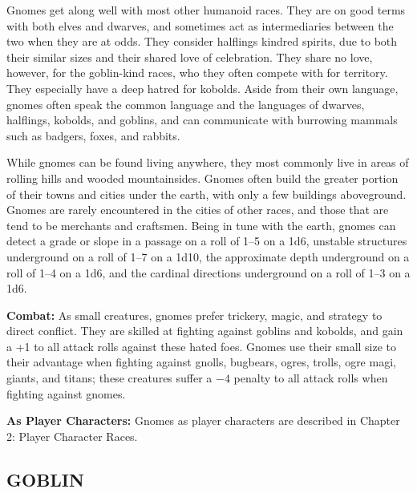 \begin{multicols}{2}
Gnomes get along well with most other humanoid races. They are on good terms with both elves and dwarves, and sometimes act as intermediaries between the two when they are at odds. They consider halflings kindred spirits, due to both their similar sizes and their shared love of celebration. They share no love, however, for the goblin-kind races, who they often compete with for territory. They especially have a deep hatred for kobolds. Aside from their own language, gnomes often speak the common language and the languages of dwarves, halflings, kobolds, and goblins, and can communicate with burrowing mammals such as badgers, foxes, and rabbits.

While gnomes can be found living anywhere, they most commonly live in areas of rolling hills and wooded mountainsides. Gnomes often build the greater portion of their towns and cities under the earth, with only a few buildings aboveground. Gnomes are rarely encountered in the cities of other races, and those that are tend to be merchants and craftsmen. Being in tune with the earth, gnomes can detect a grade or slope in a passage on a roll of 1--5 on a 1d6, unstable structures underground on a roll of 1--7 on a 1d10, the approximate depth underground on a roll of 1--4 on a 1d6, and the cardinal directions underground on a roll of 1--3 on a 1d6.

\textbf{Combat:} As small creatures, gnomes prefer trickery, magic, and strategy to direct conflict. They are skilled at fighting against goblins and kobolds, and gain a +1 to all attack rolls against these hated foes. Gnomes use their small size to their advantage when fighting against gnolls, bugbears, ogres, trolls, ogre magi, giants, and titans; these creatures suffer a $-4$ penalty to all attack rolls when fighting against gnomes.

\textbf{As Player Characters:} Gnomes as player characters are described in Chapter 2: Player Character Races.

\noindent\begin{minipage}{\columnwidth}

\vspace{1em}

\subsection{GOBLIN}


\end{minipage}
\end{multicols}
